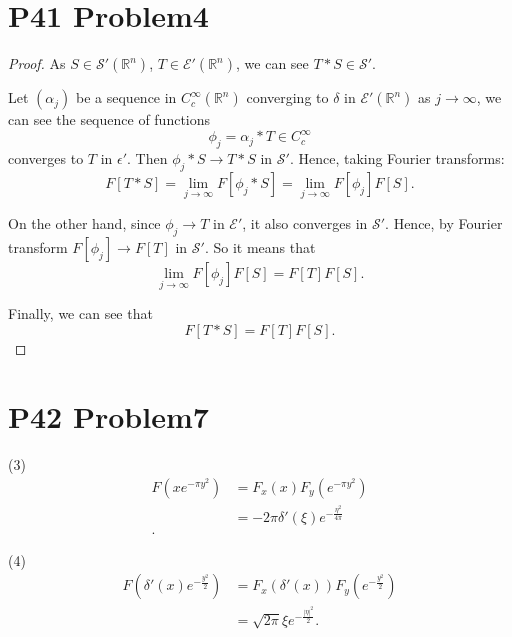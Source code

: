 \documentclass[a4paper]{ctexart}
\begin{document}
\section*{P41 Problem4}
\begin{proof}
    As $S\in\mathscr{S}'(\mathbb{R}^{n})$, $T\in\mathscr{E}'(\mathbb{R}^{n})$, we can see $T*S\in\mathscr{S}'$. 

    Let $(\alpha_{j})$ be a sequence in $C_{c}^{\infty}(\mathbb{R}^{n})$ converging to $\delta$ in $\mathscr{E}'(\mathbb{R}^{n})$ as $j\rightarrow\infty$, we can see the sequence of functions 
    \begin{equation}
        \phi_{j}=\alpha_{j}*T\in C_{c}^{\infty}
    \end{equation}
    converges to $T$ in $\mathscr{\epsilon}'$. Then $\phi_{j}*S\rightarrow T*S$ in $\mathscr{S}'$. Hence, taking Fourier transforms:
    \begin{equation}
        F[T*S]=\lim_{j\rightarrow\infty}F[\phi_{j}*S]=\lim_{j\rightarrow\infty}F[\phi_{j}]F[S].
    \end{equation}

    On the other hand, since $\phi_{j}\rightarrow T$ in $\mathscr{E}'$, it also converges in $\mathscr{S}'$. Hence, by Fourier transform $F[\phi_{j}]\rightarrow F[T]$ in $\mathscr{S}'$.
    So it means that 
    \begin{equation}
        \lim_{j\rightarrow\infty}F[\phi_{j}]F[S]=F[T]F[S].
    \end{equation}

    Finally, we can see that
    \begin{equation}
        F[T*S]=F[T]F[S].
    \end{equation}
\end{proof}
\section*{P42 Problem7}
(3)
\begin{equation}
    \begin{aligned}
        F(xe^{-\pi y^2})&=F_{x}(x)F_{y}(e^{-\pi y^2})\\
        &=-2\pi\delta'(\xi)e^{-\frac{\eta^{2}}{4\pi}}\\.    
    \end{aligned}
\end{equation}

(4)
\begin{equation}
    \begin{aligned}
        F(\delta'(x)e^{-\frac{y^2}{2}})&=F_{x}(\delta'(x))F_{y}(e^{-\frac{y^2}{2}})\\
        &=\sqrt{2\pi}\xi e^{-\frac{|\eta|^{2}}{2}}.\\
    \end{aligned}
\end{equation}
\end{document}
